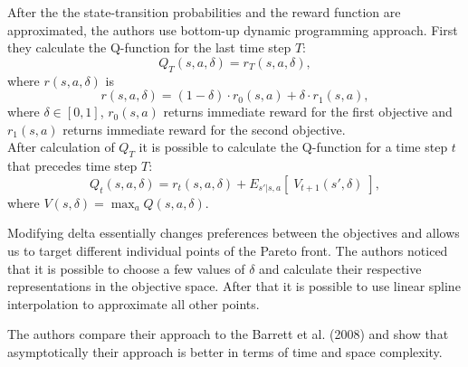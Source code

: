 After the the state-transition probabilities and the reward function are approximated, the authors use bottom-up dynamic programming approach. First they calculate the Q-function for the last time step $T$:
$$ Q_{T}(s,a,\delta) = r_{T}(s,a,\delta), $$
where $r(s,a,\delta)$ is
$$ r(s,a,\delta) = (1 - \delta) \cdot r_{0}(s,a) + \delta \cdot r_{1}(s,a), $$
where $ \delta \in [0,1] $, $ r_{0}(s,a) $ returns immediate reward for the first objective and $ r_{1}(s,a) $ returns immediate reward for the second objective. \\

After calculation of $ Q_{T} $ it is possible to calculate the Q-function for a time step $ t $ that precedes time step $ T $:
$$ Q_{t}(s,a,\delta) = r_{t}(s,a,\delta) + E_{s'|s,a} \left[\; V_{t+1}(s',\delta)\;\right], $$
where $ V(s,\delta) = \max_a Q(s,a,\delta). $

Modifying delta essentially changes preferences between the objectives and allows us to target different individual points of the Pareto front. The authors noticed that it is possible to choose a few values of $ \delta $ and calculate their respective representations in the objective space. After that it is possible to use linear spline interpolation to approximate all other points.

The authors compare their approach to the Barrett et al. (2008)\nocite{barrett2008learning} and show that asymptotically their approach is better in terms of time and space complexity.

























